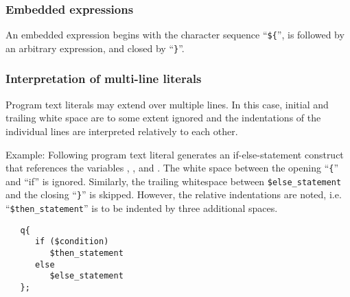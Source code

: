 \subsubsection{Embedded expressions}

An embedded expression begins with the character sequence
``\lstinline!${!'', %
is followed by an arbitrary expression, and closed by
``\lstinline!}!''.

\subsubsection{Interpretation of multi-line literals}

Program text literals may extend over multiple lines. In this
case, initial and trailing white space are to some extent ignored
and the indentations of the individual lines are interpreted
relatively to each other.

Example: Following program text literal generates an
if-else-statement construct that references the variables
, , and .
The white space between the opening ``\lstinline!{!''
and ``if'' is ignored. Similarly, the trailing whitespace between
\lstinline!$else_statement! %
and the closing
``\lstinline!}!''
is skipped.
However, the relative indentations are noted, i.e.
``\lstinline!$then_statement!'' %
is to be indented by three additional spaces.

\begin{lstlisting}
   q{
      if ($condition)
         $then_statement
      else
         $else_statement
   };
\end{lstlisting}

\endinput
